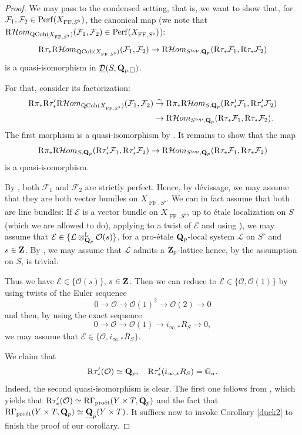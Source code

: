 \documentclass[10pt]{amsart}
\let\cal\mathcal
\theoremstyle{definition}
\theoremstyle{remark}
\newcommand{\proeet}{\operatorname{pro\acute{e}t} }
\newcommand{\Hhom}{{\cal Hom}}
\newcommand{\LL}{\operatorname{L} }
\newcommand{\FF}{\operatorname{FF} }
\newcommand{\sff}{{\mathcal{F}}}
\newcommand{\sll}{{\mathcal{L}}}
\newcommand{\so}{{\mathcal O}}
\newcommand{\se}{{\mathcal{E}}}
\newcommand{\sd}{{\mathcal{D}}}
\numberwithin{equation}{section}
\def\R{{\mathrm R}}
\def\Q{{\bf Q}} \def\Z{{\bf Z}}
\numberwithin{equation}{section}
\begin{document}
\begin{proof}  We may pass to the condensed setting, that is, we want to show that, for  $\sff_1, \sff_2 \in {\rm Perf}(X_{\FF, S^{\flat}})$,   the canonical map   (we note that $\R\Hhom_{{\rm QCoh}(X_{\FF,S^{\flat}})}(\sff_1,\sff_2)\in {\rm Perf}(X_{\FF, S^{\flat}})$):
$$
\R\tau_*\R\Hhom_{{\rm QCoh}(X_{\FF,S^{\flat}})}(\sff_1,\sff_2)\to \R\Hhom_{S^{\rm top},\Q_{p}}(\R\tau_*\sff_1,\R\tau_*\sff_2)
$$
is a quasi-isomorphism in $\underline{\sd}(S,\Q_{p,\Box})$.

  For that, consider its factorization:
  \begin{align*}
\R\pi_*\R\tau^{\prime}_*\R\Hhom_{{\rm QCoh}(X_{\FF,S^{\flat}})}(\sff_1,\sff_2) &\stackrel{\sim}{ \to }
\R\pi_*\R\Hhom_{S,\Q_{p}}(\R\tau^{\prime}_*\sff_1,\R\tau^{\prime}_*\sff_2)\\
 & \to 
\R\Hhom_{S^{\rm top},\Q_{p}}(\R\tau_*\sff_1,\R\tau_*\sff_2).
\end{align*}
The first morphism is a quasi-isomorphism by \cite[Cor. 3.10]{AnLB}. It remains  to show that the map
\begin{equation}\label{maybe3-52}
\R\pi_*\R\Hhom_{S,\Q_{p}}(\R\tau^{\prime}_*\sff_1,\R\tau^{\prime}_*\sff_2)
  \to 
\R\Hhom_{S^{\rm top},\Q_{p}}(\R\tau_*\sff_1,\R\tau_*\sff_2)
\end{equation}
is a quasi-isomorphism. 

   By \cite[Prop. 2.6]{AnLB}, both $ \sff_1$ and $\sff_2$ are strictly perfect. Hence, by d\'evissage, 
we may assume that they are both vector bundles
on $X_{\FF, S^{\flat}}$.  We can in fact assume that both are line bundles:   If $\se$ is a vector bundle on $X_{\FF, S^{\flat}}$, up to \'etale  localization  on
$S$ (which we are allowed to do), applying  \cite[Prop. II.3.1] {FS} to  a twist of $\se$ and   using \cite[Cor.
II.2.20]{FS}), we may assume that $\se\in \{\sll\otimes^{\LL}_{\Q_p}\so(s)\}$, for  a pro-\'etale $\Q_p$-local system $\sll$ on $S^{\flat}$ and $s\in\Z$. 
By \cite[Prop. 8.4.7]{KL15}, we may assume that $\sll$ admits a $\Z_p$-lattice hence, by the assumption on $S$, is trivial. 
 
  
    Thus we have $\se\in\{\so(s)\}$, $s\in\Z$. Then we can  reduce to  $\se\in \{\so ,\so (1)\}$ by  using twists of the 
 Euler sequence
$$
0\to \so\to \so(1)^{2}\to \so(2)\to 0
$$
and then,  by using  the exact
sequence
$$
0 \to  \so  \to  \so (1) \to i_{\infty,*}R_S \to  0,
$$
  we may  assume that $\se\in  \{\so ,i_{\infty,*}R_S\}.$ 
 
     We claim that 
$$\R\tau^{\prime}_*(\so)\simeq  \Q_p,\quad \R\tau^{\prime}_*(i_{\infty,*}R_S) = {\mathbb G}_a.
$$
Indeed, the second quasi-isomorphism is clear. The first one  follows from \cite[Prop. II.2.5 (ii)]{FS}, which yields that $\R\tau^{\prime}_*(\so)\simeq \R\Gamma_{\proeet}(Y\times T, \Q_p)$ and the fact that
$\R\Gamma_{\proeet}(Y\times T, \Q_p)\simeq \underline{\Q}_p(Y\times T)$. It suffices now to 
invoke Corollary \ref{duck2} to finish the proof of our corollary.
\end{proof}
\end{document}

